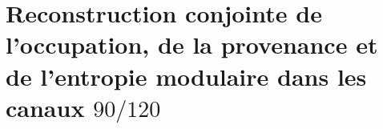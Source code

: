 \section{Reconstruction conjointe de l’occupation, de la provenance et de l’entropie modulaire dans les canaux \(90/120\)}

